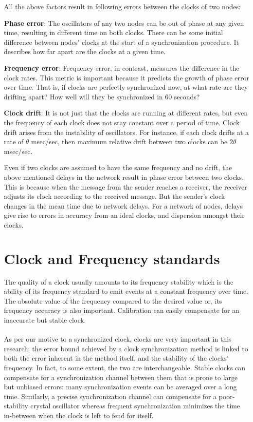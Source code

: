 \documentclass[a4paper,10pt]{report}
\begin{document}
      All the above factors result in following errors between the clocks of two nodes:
\begin{description}
\item \textbf{Phase error}: The oscillators of any two nodes can be out of phase at any given time, resulting in different time on both clocks. There can be some initial difference between nodes' clocks at the start of a synchronization procedure. It describes how far apart are the clocks at a given time.
\item \textbf{Frequency error}: Frequency error, in contrast, measures the difference in the clock rates. This metric is important because it predicts the growth of phase error over time. That is, if clocks are perfectly synchronized now, at what rate are they drifting apart? How well will they be synchronized in 60 seconds?
\item \textbf{Clock drift}: It is not just that the clocks are running at different rates, but even the frequency of each clock does not stay constant over a period of time. Clock drift arises from the instability of oscillators. For instance, if each clock drifts at a rate of $\theta$ msec/sec, then maximum relative drift between two clocks can be 2$\theta$ msec/sec.
\end{description}
Even if two clocks are assumed to have the same frequency and no drift, the above mentioned delays in the network result in phase
error between two clocks. This is because when the message from the sender reaches a receiver, the receiver adjusts its clock according
to the received message. But the sender's clock changes in the mean time due to network delays. For a network of nodes, delays give rise
to errors in accuracy from an ideal clocks, and dispersion amongst their clocks.
\section{\textbf{Clock and Frequency standards}}\par
The quality of a clock usually amounts to its frequency stability which is the ability of its frequency standard to emit
events at a constant frequency over time. The absolute value of the frequency compared to the desired value or, its frequency accuracy
is also important. Calibration can easily compensate for an inaccurate but stable clock.
\paragraph*{} As per our motive to a synchronized clock, clocks are very important in this research: the error bound achieved by a clock
synchronization method is linked to both the error inherent in the method itself, and the stability of the clocks' frequency. In fact,
to some extent, the two are interchangeable. Stable clocks can compensate for a synchronization channel between them that is prone
to large but unbiased errors: many synchronization events can be averaged over a long time. Similarly, a precise synchronization
channel can compensate for a poor-stability crystal oscillator whereas frequent synchronization minimizes the time in-between when the
clock is left to fend for itself.
\end{document}
